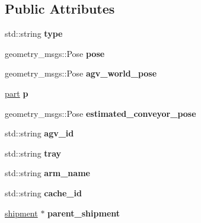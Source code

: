 \subsection*{Public Attributes}
\begin{DoxyCompactItemize}
\item 
\mbox{\label{structProduct_a9794c822ffdfc304df2c70ba43af1916}} 
std\+::string {\bfseries type}
\item 
\mbox{\label{structProduct_afdb4498246a795bdc91b8df0ba2f76b4}} 
geometry\+\_\+msgs\+::\+Pose {\bfseries pose}
\item 
\mbox{\label{structProduct_a930e4b3e273598c534709f22cb1d4cac}} 
geometry\+\_\+msgs\+::\+Pose {\bfseries agv\+\_\+world\+\_\+pose}
\item 
\mbox{\label{structProduct_a480966ce45a977dc57781b84e540292d}} 
\hyperlink{utils_8h_a67ee3a5b9091664130eca8efc8b97ab9}{part} {\bfseries p}
\item 
\mbox{\label{structProduct_a1a6ed448aeeed12f563d5ff05a26f936}} 
geometry\+\_\+msgs\+::\+Pose {\bfseries estimated\+\_\+conveyor\+\_\+pose}
\item 
\mbox{\label{structProduct_a362e1bca7dacf78ca01aa09cba4bdbb1}} 
std\+::string {\bfseries agv\+\_\+id}
\item 
\mbox{\label{structProduct_ab8ab1c46e9406bdb591c8b32c3d6bb5f}} 
std\+::string {\bfseries tray}
\item 
\mbox{\label{structProduct_ab7b619e3758e153315fd6960d025a7ba}} 
std\+::string {\bfseries arm\+\_\+name}
\item 
\mbox{\label{structProduct_aec6bebef64a095bd9ca08c3c1d107d2b}} 
std\+::string {\bfseries cache\+\_\+id}
\item 
\mbox{\label{structProduct_a6cdcd7f1ac8ef015c20baa1c93765885}} 
\hyperlink{utils_8h_af15e89ebba88d2450b2866c705b15559}{shipment} $\ast$ {\bfseries parent\+\_\+shipment}
\item 
\mbox{\label{structProduct_acf26204944fd9b2806361d166004ce26}} 

\end{DoxyCompactItemize}
